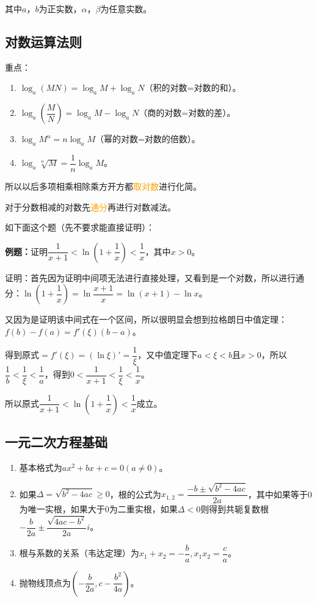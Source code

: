 \documentclass[UTF8, 12pt]{ctexart}
\begin{document}
其中$a$，$b$为正实数，$\alpha$，$\beta$为任意实数。

\subsection{对数运算法则}

重点：

\begin{enumerate}
    \item $\log_a(MN)=\log_aM+\log_aN$（积的对数=对数的和）。
    \item $\log_a(\dfrac{M}{N})=\log_aM-\log_aN$（商的对数=对数的差）。
    \item $\log_aM^n=n\log_aM$（幂的对数=对数的倍数）。
    \item $\log_a\sqrt[n]{M}=\dfrac{1}{n}\log_aM$。
\end{enumerate}

所以以后多项相乘相除乘方开方都\textcolor{orange}{取对数}进行化简。

对于分数相减的对数先\textcolor{orange}{通分}再进行对数减法。

如下面这个题（先不要求能直接证明）：

\textbf{例题：}证明$\dfrac{1}{x+1}<\ln(1+\dfrac{1}{x})<\dfrac{1}{x}$，其中$x>0$。

证明：首先因为证明中间项无法进行直接处理，又看到是一个对数，所以进行通分：$\ln(1+\dfrac{1}{x})=\ln\dfrac{x+1}{x}=\ln(x+1)-\ln x$。

又因为是证明该中间式在一个区间，所以很明显会想到拉格朗日中值定理：$f(b)-f(a)=f'(\xi)(b-a)$。

得到原式$=f'(\xi)=(\ln\xi)'=\dfrac{1}{\xi}$，又中值定理下$a<\xi<b$且$x>0$，所以$\dfrac{1}{b}<\dfrac{1}{\xi}<\dfrac{1}{a}$，得到$0<\dfrac{1}{x+1}<\dfrac{1}{\xi}<\dfrac{1}{x}$。

所以原式$\dfrac{1}{x+1}<\ln(1+\dfrac{1}{x})<\dfrac{1}{x}$成立。

\subsection{一元二次方程基础}

\begin{enumerate}
    \item 基本格式为$ax^2+bx+c=0(a\neq 0)$。
    \item 如果$\Delta=\sqrt{b^2-4ac}\geqslant 0$，根的公式为$x_{1,2}=\dfrac{-b\pm\sqrt{b^2-4ac}}{2a}$，其中如果等于0为唯一实根，如果大于0为二重实根，如果$\Delta<0$则得到共轭复数根$-\dfrac{b}{2a}\pm\dfrac{\sqrt{4ac-b^2}}{2a}i$。
    \item 根与系数的关系（韦达定理）为$x_1+x_2=-\dfrac{b}{a},x_1x_2=\dfrac{c}{a}$。
    \item 抛物线顶点为$(-\dfrac{b}{2a},c-\dfrac{b^2}{4a})$。
\end{enumerate}
\end{document}
